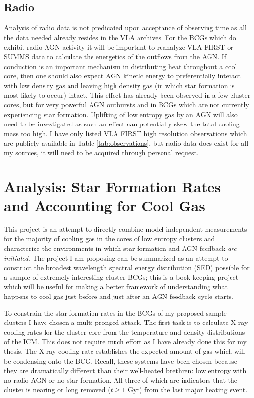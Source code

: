 \documentclass[11pt]{article}
\begin{document}
\subsection{Radio}
Analysis of radio data is not predicated upon acceptance of observing
time as all the data needed already resides in the VLA archives. For
the BCGs which do exhibit radio AGN activity it will be important to
reanalyze VLA FIRST or SUMMS data to calculate the energetics of the
outflows from the AGN. If conduction is an important mechanism in
distributing heat throughout a cool core, then one should also expect
AGN kinetic energy to preferentially interact with low density gas
and leaving high density gas (in which star formation is most likely
to occur) intact. This effect has already been observed in a few
cluster cores, but for very powerful AGN outbursts and in BCGs which
are not currently experiencing star formation. Uplifting of low
entropy gas by an AGN will also need to be investigated as such an
effect can potentially skew the total cooling mass too high. I have
only listed VLA FIRST high resolution observations which are
publicly available in Table \ref{tab:observations}, but radio data
does exist for all my sources, it will need to be acquired through
personal request.

\section{Analysis: Star Formation Rates and Accounting for Cool Gas}
This project is an attempt to directly combine model independent
measurements for the majority of cooling gas in the cores of low
entropy clusters and characterize the environments in which star
formation and AGN feedback {\it are initiated}. The project I am
proposing can be summarized as an attempt to construct the broadest
wavelength spectral energy distribution (SED) possible for a sample of
extremely interesting cluster BCGs; this is a book-keeping project
which will be useful for making a better framework of understanding
what happens to cool gas just before and just after an AGN feedback
cycle starts.

To constrain the star formation rates in the BCGs of my proposed
sample clusters I have chosen a multi-pronged attack. The first task is
to calculate X-ray cooling rates for the cluster core from the
temperature and density distributions of the ICM. This does not
require much effort as I have already done this for my thesis. The
X-ray cooling rate establishes the expected amount of gas which will be
condensing onto the BCG. Recall, these systems have been chosen
because they are dramatically different than their well-heated
brethren: low entropy with no radio AGN or no star formation. All
three of which are indicators that the cluster is nearing or long
removed ($t \geq 1$ Gyr) from the last major heating event.
\end{document}
